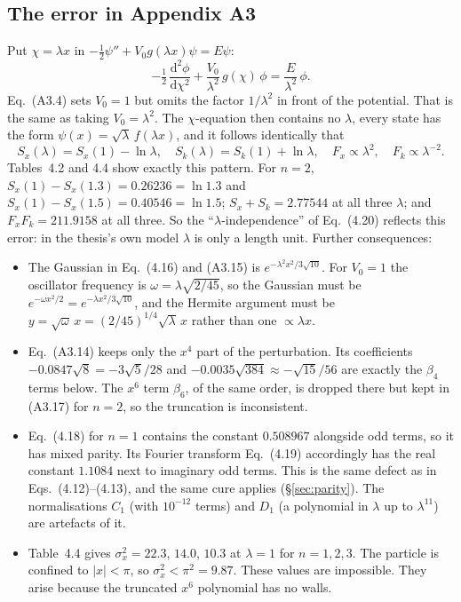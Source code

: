 \documentclass[11pt,a4paper]{article}
\newcommand{\Eq}[1]{Eq.~(#1)}
\newcommand{\dd}{\mathrm{d}}
\begin{document}
\subsection{The error in Appendix A3}
Put $\chi=\lambda x$ in $-\tfrac12\psi''+V_0g(\lambda x)\psi=E\psi$:
\begin{equation}
-\tfrac12\,\frac{\dd^2\phi}{\dd\chi^2}+\frac{V_0}{\lambda^2}\,g(\chi)\,\phi=\frac{E}{\lambda^2}\,\phi .
\label{eq:chi}
\end{equation}
\Eq{A3.4} sets $V_0=1$ but omits the factor $1/\lambda^2$ in front of the potential. That is
the same as taking $V_0=\lambda^2$. The $\chi$-equation then contains no $\lambda$, every
state has the form $\psi(x)=\sqrt\lambda\,f(\lambda x)$, and it follows identically that
\begin{equation}
S_x(\lambda)=S_x(1)-\ln\lambda,\quad S_k(\lambda)=S_k(1)+\ln\lambda,\quad F_x\propto\lambda^2,\quad F_k\propto\lambda^{-2}.
\label{eq:scaling}
\end{equation}
Tables~4.2 and 4.4 show exactly this pattern. For $n=2$, $S_x(1)-S_x(1.3)=0.26236=\ln1.3$
and $S_x(1)-S_x(1.5)=0.40546=\ln1.5$; $S_x+S_k=2.77544$ at all three $\lambda$; and
$F_xF_k=211.9158$ at all three. So the ``$\lambda$-independence'' of \Eq{4.20} reflects this
error: in the thesis's own model $\lambda$ is only a length unit. Further consequences:
\begin{itemize}
\item The Gaussian in \Eq{4.16} and (A3.15) is $e^{-\lambda^2x^2/3\sqrt{10}}$. For $V_0=1$ the
  oscillator frequency is $\omega=\lambda\sqrt{2/45}$, so the Gaussian must be
  $e^{-\omega x^2/2}=e^{-\lambda x^2/3\sqrt{10}}$, and the Hermite argument must be
  $y=\sqrt\omega\,x=(2/45)^{1/4}\sqrt\lambda\,x$ rather than one $\propto\lambda x$.
\item \Eq{A3.14} keeps only the $x^4$ part of the perturbation. Its coefficients
  $-0.0847\sqrt8=-3\sqrt5/28$ and $-0.0035\sqrt{384}\approx-\sqrt{15}/56$ are exactly the
  $\beta_4$ terms below. The $x^6$ term $\beta_6$, of the same order, is dropped there but
  kept in (A3.17) for $n=2$, so the truncation is inconsistent.
\item \Eq{4.18} for $n=1$ contains the constant $0.508967$ alongside odd terms, so it has
  mixed parity. Its Fourier transform \Eq{4.19} accordingly has the real constant $1.1084$
  next to imaginary odd terms. This is the same defect as in Eqs.~(4.12)--(4.13), and the
  same cure applies (\S\ref{sec:parity}). The normalisations $C_1$ (with $10^{-12}$ terms)
  and $D_1$ (a polynomial in $\lambda$ up to $\lambda^{11}$) are artefacts of it.
\item Table~4.4 gives $\sigma_x^2=22.3$, $14.0$, $10.3$ at $\lambda=1$ for $n=1,2,3$. The particle
  is confined to $|x|<\pi$, so $\sigma_x^2<\pi^2=9.87$. These values are impossible. They
  arise because the truncated $x^6$ polynomial has no walls.
\end{itemize}
\end{document}
